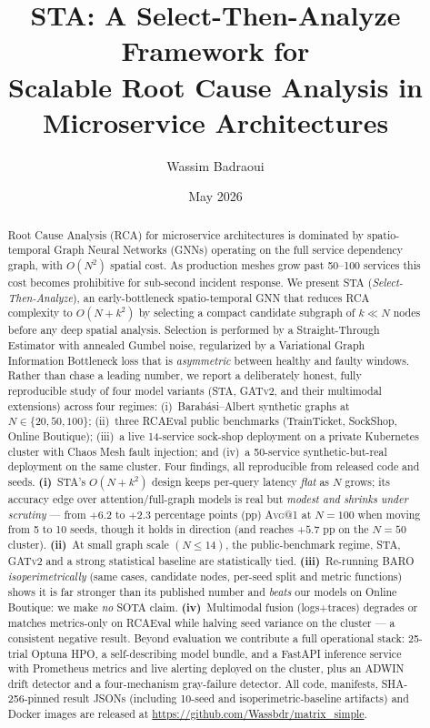 \documentclass[11pt,a4paper]{article}
\title{\textbf{STA: A Select-Then-Analyze Framework for\\
Scalable Root Cause Analysis in Microservice Architectures}}
\author[1,2]{Wassim Badraoui}
\affil[1]{Devoteam, Paris, France}
\affil[2]{EPITA, Paris, France}
\affil[ ]{\texttt{wassim.badraoui@epita.fr}}
\date{May 2026}
\makeatletter
\newcommand{\Avg}[1]{\textsc{Avg}@{#1}}
\newcommand{\STA}{\textsc{STA}}
\newcommand{\GATv}{\textsc{GATv2}}
\makeatother
\begin{document}
\maketitle

\begin{abstract}
Root Cause Analysis (RCA) for microservice architectures is dominated by
spatio-temporal Graph Neural Networks (GNNs) operating on the full service
dependency graph, with $O(N^2)$ spatial cost. As production meshes grow past
50--100 services this cost becomes prohibitive for sub-second incident
response. We present \STA{} (\emph{Select-Then-Analyze}), an early-bottleneck
spatio-temporal GNN that reduces RCA complexity to $O(N + k^{2})$ by selecting
a compact candidate subgraph of $k \ll N$ nodes before any deep spatial
analysis. Selection is performed by a Straight-Through Estimator with annealed
Gumbel noise, regularized by a Variational Graph Information Bottleneck loss
that is \emph{asymmetric} between healthy and faulty windows. Rather than chase
a leading number, we report a deliberately honest, fully reproducible
study of four model variants (\STA{}, \GATv{}, and their multimodal extensions)
across four regimes: (i)~Barab\'asi--Albert synthetic graphs at
$N\in\{20,50,100\}$; (ii)~three RCAEval public benchmarks (TrainTicket,
SockShop, Online Boutique); (iii)~a live 14-service sock-shop deployment on a
private Kubernetes cluster with Chaos Mesh fault injection; and (iv)~a
50-service synthetic-but-real deployment on the same cluster. Four findings, all
reproducible from released code and seeds. \textbf{(i)}~\STA{}'s $O(N+k^2)$
design keeps per-query latency \emph{flat} as $N$ grows; its accuracy edge over
attention/full-graph models is real but \emph{modest and shrinks under
scrutiny} --- from $+6.2$ to $+2.3$ percentage points (pp) \Avg{1} at $N{=}100$
when moving from 5 to 10 seeds, though it holds in direction (and reaches
$+5.7$ pp on the $N{=}50$ cluster). \textbf{(ii)}~At small graph scale
$(N{\le}14)$, the public-benchmark regime, \STA{}, \GATv{} and a strong
statistical baseline are statistically tied. \textbf{(iii)}~Re-running BARO
\emph{isoperimetrically} (same cases, candidate nodes, per-seed split and
metric functions) shows it is far stronger than its published number and
\emph{beats} our models on Online Boutique: we make \emph{no} SOTA claim.
\textbf{(iv)}~Multimodal fusion (logs+traces) degrades or matches metrics-only
on RCAEval while halving seed variance on the cluster --- a consistent negative
result. Beyond evaluation we contribute a full operational stack: 25-trial
Optuna HPO, a self-describing model bundle, and a FastAPI inference service
with Prometheus metrics and live alerting deployed on the cluster, plus an
ADWIN drift detector and a four-mechanism gray-failure detector. All code,
manifests, SHA-256-pinned result JSONs (including 10-seed and
isoperimetric-baseline artifacts) and Docker images are released at
\url{https://github.com/Wassbdr/matrix_simple}.
\end{abstract}
\end{document}
